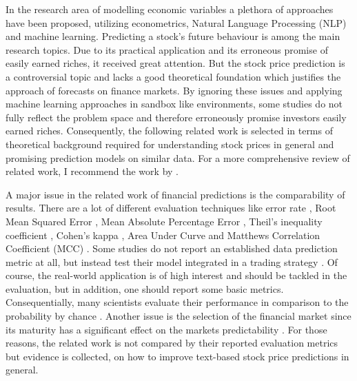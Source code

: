


In the research area of modelling economic variables a plethora of approaches have been proposed, utilizing econometrics, Natural Language Processing (NLP) and machine learning. Predicting a stock's future behaviour is among the main research topics. Due to its practical application and its erroneous promise of easily earned riches, it received great attention. But the stock price prediction is a controversial topic and lacks a good theoretical foundation which justifies the approach of forecasts on finance markets. By ignoring these issues and applying machine learning approaches in sandbox like environments, some studies do not fully reflect the problem space and therefore erroneously promise investors easily earned riches. Consequently, the following related work is selected in terms of theoretical background required for understanding stock prices in general and promising prediction models on similar data. For a more comprehensive review of related work, I recommend the work by \citet{Hsu2016BridgingEconomists, KhadjehNassirtoussi2014TextReview, Cavalcante2016ComputationalDirections}.


A major issue in the related work of financial predictions is the comparability of results. There are a lot of different evaluation techniques like error rate \cite{Peng2016LeverageNetworks, Yoshihara2014PredictingNetworks}, Root Mean Squared Error \cite{Feuerriegel2018Long-termDisclosures}, Mean Absolute Percentage Error \cite{Bollen2011TwitterMarket, Xiong2015DeepTrends}, Theil’s inequality coefficient \cite{Bao2017AMemory.}, Cohen's kappa \cite{Tsantekidis2017UsingMarkets}, Area Under Curve \cite{Ballings2015EvaluatingPrediction} and Matthews Correlation Coefficient (MCC) \cite{Ding2014UsingInvestigation}. Some studies do not report an established data prediction metric at all, but instead test their model integrated in a trading strategy \cite{Deng2017DeepTrading, Ruiz2012CorrelatingActivity}. Of course, the real-world application is of high interest and should be tackled in the evaluation, but in addition, one should report some basic metrics. Consequentially, many scientists evaluate their performance in comparison to the probability by chance \cite{KhadjehNassirtoussi2014TextReview}. Another issue is the selection of the financial market since its maturity has a significant effect on the markets predictability \cite{Hsu2016BridgingEconomists}. For those reasons, the related work is not compared by their reported evaluation metrics but evidence is collected, on how to improve text-based stock price predictions in general.

